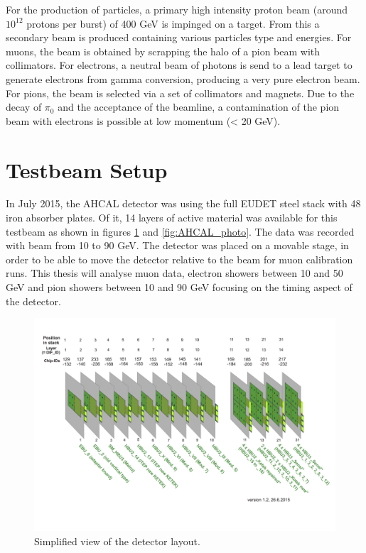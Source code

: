 For the production of particles, a primary high intensity proton beam (around $10^{12}$ protons per burst) of 400 GeV is impinged on a target. From this a secondary beam is produced containing various particles type and energies. For muons, the beam is obtained by scrapping the halo of a pion beam with collimators. For electrons, a neutral beam of photons is send to a lead target to generate electrons from gamma conversion, producing a very pure electron beam. For pions, the beam is selected via a set of collimators and magnets. Due to the decay of $\pi_0$ and the acceptance of the beamline, a contamination of the pion beam with electrons is possible at low momentum (< 20 GeV).

\section{Testbeam Setup}

In July 2015, the AHCAL detector was using the full EUDET steel stack \cite{EUDET-Report-2010-02} with 48 iron absorber plates. Of it, 14 layers of active material was available for this testbeam as shown in figures \ref{fig:Det_layout} and \ref{fig:AHCAL_photo}. The data was recorded with beam from 10 to 90 GeV. The detector was placed on a movable stage, in order to be able to move the detector relative to the beam for muon calibration runs. This thesis will analyse muon data, electron showers between 10 and 50 GeV and pion showers between 10 and 90 GeV focusing on the timing aspect of the detector.

\begin{figure}[htbp!]
	\centering
	\includegraphics[width=1\linewidth]{chap5/fig_EnergyCalib/Detector_layout.png}
	\caption{Simplified view of the detector layout.} \label{fig:Det_layout}
\end{figure}

